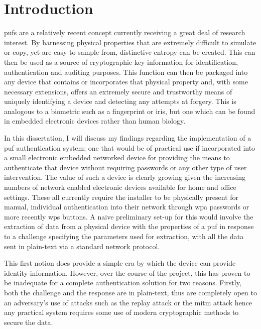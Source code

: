 
\chapter{Introduction} %

\label{ch:introduction}


\Glspl{puf} are a relatively recent concept currently receiving a great deal of research interest.
By harnessing physical properties that are extremely difficult to simulate or copy, yet are
easy to sample from, distinctive entropy can be created. This can then be used
as a source of cryptographic key information for identification,
authentication and auditing purposes.
This function can then be packaged into any device
that contains or incorporates that physical property and, with some necessary
extensions, offers an extremely secure and trustworthy means of uniquely
identifying a device and detecting any attempts at forgery.
This is analogous to a biometric such as a fingerprint or iris, but one which
can be found in embedded electronic devices rather than human biology.

In this dissertation, I will discuss my findings regarding the implementation of
a \gls{puf} authentication system; one that would be of practical use if
incorporated into a small electronic embedded networked device for providing
the means to authenticate that device without requiring passwords or any
other type of user intervention.
The value of such a device is clearly growing\cite{press2014forbes}
given the increasing numbers of network enabled electronic devices available
for home and office settings. These all currently require the installer to be physically
present for manual, individual authentication into their network through
\gls{wpa} passwords or more recently \gls{wps} buttons.
A naive preliminary set-up for this would involve the extraction of data from a physical device
with the properties of a \gls{puf} in response to a challenge specifying the
parameters used for extraction, with all the data sent in plain-text via a
standard network protocol.

This first notion does provide a simple \gls{cra} by which the device can provide
identity information. However, over the course of the project,
this has proven to be inadequate for a complete authentication solution for two reasons.
Firstly, both the challenge and the response are in plain-text, thus are
completely open to an adversary's use of attacks such as the replay attack
or the \gls{mitm} attack hence any practical system requires some use of modern
cryptographic methods to secure the data.

